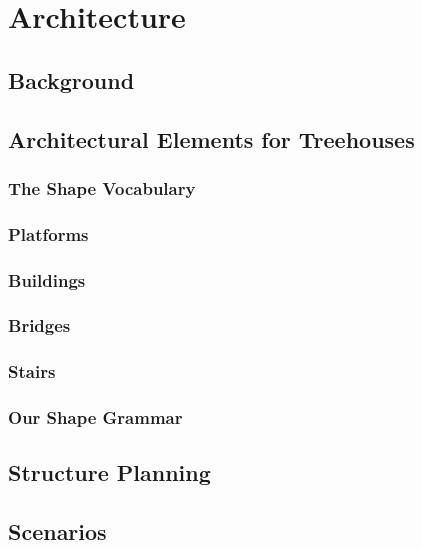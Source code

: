 
\chapter{Architecture}
\label{sec:treehousearch}
 
\section{Background}


\section{Architectural Elements for Treehouses} 
\label{sec:archelements}
 
\subsection{The Shape Vocabulary}
 
\subsection{Platforms}
\label{sec:platform}
 

\subsection{Buildings}
\label{sec:building}
 

\subsection{Bridges}
\label{sec:bridges}
 

\subsection{Stairs}
\label{sec:stairs}
  
\subsection{Our Shape Grammar}
 

\section{Structure Planning}
\label{sec:PlanningAlgorithm} 
 
 
  
\section{Scenarios}

